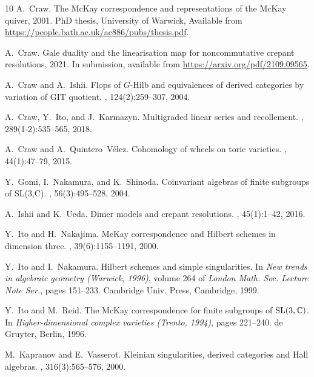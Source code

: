 \documentclass[11pt,reqno]{amsart}
\numberwithin{equation}{section}
\theoremstyle{definition}
\newcommand{\0}{\operatorname{0}}
\begin{document}
{\begin{thebibliography}{10}
A.~Craw.
\newblock The {M}c{K}ay correspondence and representations of the {M}c{K}ay
  quiver, 2001.
\newblock PhD thesis, University of Warwick, Available from
  \url{https://people.bath.ac.uk/ac886/pubs/thesis.pdf}.

A.~Craw.
\newblock Gale duality and the linearisation map for noncommutative crepant
  resolutions, 2021.
\newblock In submission, available from \url{https://arxiv.org/pdf/2109.09565}.

A.~Craw and A.~Ishii.
\newblock Flops of {$G$}-{H}ilb and equivalences of derived categories by
  variation of {GIT} quotient.
, 124(2):259--307, 2004.

A.~Craw, Y.~Ito, and J.~Karmazyn.
\newblock Multigraded linear series and recollement.
, 289(1-2):535--565, 2018.

A.~Craw and A.~Quintero~V\'elez.
\newblock Cohomology of wheels on toric varieties.
, 44(1):47--79, 2015.

Y.~Gomi, I.~Nakamura, and K.~Shinoda.
\newblock Coinvariant algebras of finite subgroups of {SL}(3,{C}).
, 56(3):495--528, 2004.

A.~Ishii and K.~Ueda.
\newblock Dimer models and crepant resolutions.
, 45(1):1--42, 2016.

Y.~Ito and H.~Nakajima.
\newblock Mc{K}ay correspondence and {H}ilbert schemes in dimension three.
, 39(6):1155--1191, 2000.

Y.~Ito and I.~Nakamura.
\newblock Hilbert schemes and simple singularities.
\newblock In {\em New trends in algebraic geometry ({W}arwick, 1996)}, volume
  264 of {\em London Math. Soc. Lecture Note Ser.}, pages 151--233. Cambridge
  Univ. Press, Cambridge, 1999.

Y.~Ito and M.~Reid.
\newblock The {M}c{K}ay correspondence for finite subgroups of {${\rm
  SL}(3,\mathbb{C})$}.
\newblock In {\em Higher-dimensional complex varieties ({T}rento, 1994)}, pages
  221--240. de Gruyter, Berlin, 1996.

M.~Kapranov and E.~Vasserot.
\newblock Kleinian singularities, derived categories and {H}all algebras.
, 316(3):565--576, 2000.


\end{thebibliography}}
\end{document}
